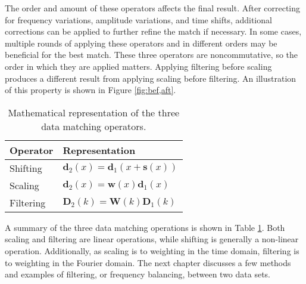The order and amount of these operators affects the final result.
After correcting for frequency variations, amplitude variations, and time shifts, additional corrections can be applied to further refine the match if necessary.
In some cases, multiple rounds of applying these operators and in different orders may be beneficial for the best match.
These three operators are noncommutative, so the order in which they are applied matters.
Applying filtering before scaling produces a different result from applying scaling before filtering. 
An illustration of this property is shown in Figure \ref{fig:bef,aft}.


\begin{table}[h]
\centering
\begin{tabular}{l|l}
\textbf{Operator} & \textbf{Representation} \\ \hline
        Shifting          & $\mathbf{d}_2(x) = \mathbf{d}_1(x + \mathbf{s}(x))$\\
        Scaling           & $\mathbf{d}_2(x) = \mathbf{w}(x)\mathbf{d}_1(x)$\\
        Filtering         & $\mathbf{D}_2(k) = \mathbf{W}(k)\mathbf{D}_1(k)$
\end{tabular}
\caption{Mathematical representation of the three data matching operators.}
\label{op}
\end{table}

A summary of the three data matching operations is shown in Table \ref{op}.
Both scaling and filtering are linear operations, while shifting is generally a non-linear operation.
Additionally, as scaling is to weighting in the time domain, filtering is to weighting in the Fourier domain.
The next chapter discusses a few methods and examples of filtering, or frequency balancing, between two data sets.
